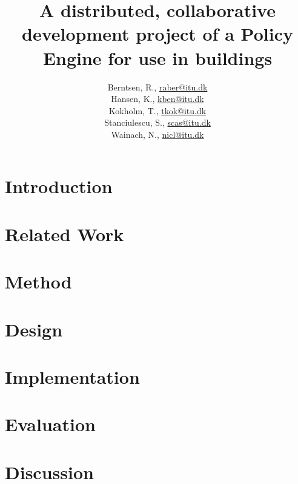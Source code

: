 \documentclass[11pt]{report}
\title{A distributed, collaborative development project of a Policy Engine for use in buildings\\\scalebox{0.85}{Global Software Development}}
\author{Berntsen, R., \url{raber@itu.dk}\\Hansen, K., \url{kben@itu.dk}\\Kokholm, T., \url{tkok@itu.dk}\\Stanciulescu, S., \url{scas@itu.dk}\\Wainach, N., \url{nicl@itu.dk}}
\begin{document}
\maketitle

\begin{abstract}

\end{abstract}

\tableofcontents


\chapter{Introduction}


\chapter{Related Work}


\chapter{Method}


\chapter{Design}


\chapter{Implementation}



\chapter{Evaluation}


\chapter{Discussion}

\end{document}
